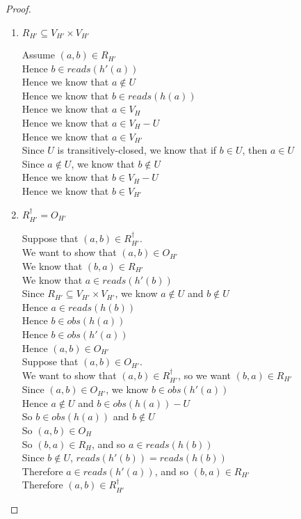 \begin{proof}
\begin{enumerate}
\item $R_{H'} \subseteq V_{H'} \times V_{H'}$
  \begin{tabbedproof}
    \oo Assume $(a,b) \in R_{H'}$ \\
    \oo Hence $b \in \mathit{reads}(h'(a))$ \\
    \oo Hence we know that $a \not\in U$ \\
    \oo Hence we know that $b \in \mathit{reads}(h(a))$ \\
    \oo Hence we know that $a \in V_H$\\
    \oo Hence we know that $a \in V_H - U$ \\
    \oo Hence we know that $a \in V_{H'}$ \\
    \oo Since $U$ is transitively-closed, we know that if $b \in U$, then $a \in U$ \\
    \oo Since $a \not\in U$, we know that $b \not\in U$ \\
    \oo Hence we know that $b \in V_H - U$ \\
    \oo Hence we know that $b \in V_{H'}$ 
  \end{tabbedproof}

\item $R^\dagger_{H'} = O_{H'}$ 
  \begin{tabbedproof}
    \oo Suppose that $(a, b) \in R^\dagger_{H'}$. \\
    \ooo We want to show that $(a, b) \in O_{H'}$ \\
    \ooo We know that $(b, a) \in R_{H'}$ \\
    \ooo We know that $a \in \mathit{reads}(h'(b))$ \\
    \ooo Since $R_{H'} \subseteq V_{H'} \times V_{H'}$, we know $a \not\in U$ and $b \not \in U$ \\
    \ooo Hence $a \in \mathit{reads}(h(b))$ \\ 
    \ooo Hence $b \in \mathit{obs}(h(a))$ \\
    \ooo Hence $b \in \mathit{obs}(h'(a))$ \\
    \ooo Hence $(a,b) \in O_{H'}$ \\
    \oo Suppose that $(a, b) \in O_{H'}$. \\
    \ooo We want to show that $(a,b) \in R^\dagger_{H'}$, so we want $(b,a) \in R_{H'}$ \\
    \ooo Since $(a,b) \in O_{H'}$, we know $b \in \mathit{obs}(h'(a))$ \\
    \ooo Hence $a \not\in U$ and $b \in \mathit{obs}(h(a)) - U$ \\
    \ooo So $b \in \mathit{obs}(h(a))$ and $b \not \in U$ \\
    \ooo So $(a,b) \in O_H$ \\
    \ooo So $(b,a) \in R_H$, and so $a \in \mathit{reads}(h(b))$ \\
    \ooo Since $b \not\in U$, $\mathit{reads}(h'(b)) = \mathit{reads}(h(b))$ \\
    \ooo Therefore $a \in \mathit{reads}(h'(a))$, and so $(b,a) \in R_{H'}$ \\
    \ooo Therefore $(a,b) \in R^\dagger_{H'}$ 
  \end{tabbedproof}


\end{enumerate}
\end{proof}
